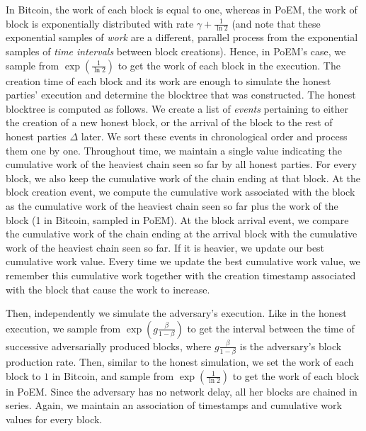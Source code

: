 In Bitcoin, the work of each block is equal to one,
whereas in PoEM, the work of block is exponentially
distributed with rate $\gamma + \frac{1}{\ln2}$ (and note that these exponential samples of \emph{work} are a different,
parallel process from the exponential samples of \emph{time intervals} between block creations).
Hence, in PoEM's case, we sample from $\exp(\frac{1}{\ln2})$ to get the work
of each block in the execution. The creation time of each block and its work are enough to simulate the honest parties' execution
and determine the blocktree that was constructed.
The honest blocktree is computed as follows. We create a list of \emph{events} pertaining to either the creation of a new honest block,
or the arrival of the block to the rest of honest parties $\Delta$ later. We sort these events in chronological order and process them one by one.
Throughout time, we maintain a single value indicating the cumulative work of the heaviest chain seen so far by all honest parties.
For every block, we also keep the cumulative work of the chain ending at that block.
At the block creation event, we compute the cumulative work associated with the block as the cumulative work of the
heaviest chain seen so far plus the work of the block (1 in Bitcoin, sampled in PoEM). At the block arrival event, we compare the
cumulative work of the chain ending at the arrival block with the cumulative work of the heaviest chain seen so far.
If it is heavier, we update our best cumulative work value. Every time we update the best cumulative work value,
we remember this cumulative work together with the creation timestamp associated with the block that cause the work to increase.

Then, independently we simulate the adversary's execution. Like in the honest execution, we sample from $\exp(g\frac{\beta}{1 - \beta})$
to get the interval between the time of successive adversarially produced blocks, where $g\frac{\beta}{1 - \beta}$ is the adversary's block production rate.
Then, similar to the honest simulation, we set the work of each block to $1$ in Bitcoin, and sample from $\exp(\frac{1}{\ln2})$ to get the work of each block in PoEM.
Since the adversary has no network delay, all her blocks are chained in series.
Again, we maintain an association of timestamps and cumulative work values for every block.

